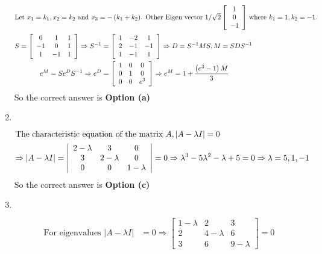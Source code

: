 \begin{enumerate}
\begin{answer}
\begin{align*}
		\intertext{Let $x_{1}=k_{1}, x_{2}=k_{2}$ and $x_{3}=-\left(k_{1}+k_{2}\right)$. Other Eigen vector $1 / \sqrt{2}\left[\begin{array}{c}1 \\ 0 \\ -1\end{array}\right]$ where $k_{1}=1, k_{2}=-1$.}
		S=\left[\begin{array}{ccc}0 & 1 & 1 \\ -1 & 0 & 1 \\ 1 & -1 & 1\end{array}\right] \Rightarrow S^{-1}&=\left[\begin{array}{ccc}1 & -2 & 1 \\ 2 & -1 & -1 \\ 1 & -1 & 1\end{array}\right] \Rightarrow D=S^{-1} M S, M=S D S^{-1}\\
		e^{M}=S e^{D} S^{-1} \Rightarrow e^{D}&=\left[\begin{array}{ccc}1 & 0 & 0 \\ 0 & 1 & 0 \\ 0 & 0 & e^{3}\end{array}\right] \Rightarrow e^{M}=1+\frac{\left(e^{3}-1\right) M}{3}
		\end{align*}
			So the correct answer is \textbf{Option (a)}
	\end{answer}
	\item $\left. \right. $	
	\begin{answer}
		\begin{align*}
		 \intertext{The characteristic equation of the matrix $A,|A-\lambda I|=0$}
		\Rightarrow|A-\lambda I|&=\left|\begin{array}{ccc}
		2-\lambda & 3 & 0 \\
		3 & 2-\lambda & 0 \\
		0 & 0 & 1-\lambda
		\end{array}\right|=0 \Rightarrow \lambda^{3}-5 \lambda^{2}-\lambda+5=0 \Rightarrow \lambda=5,1,-1
		\end{align*}
		So the correct answer is \textbf{Option (c)}
	\end{answer}
		\item $\left. \right. $	
	\begin{answer}
		\begin{align*}
		\text{For eigenvalues }|A-\lambda I|&=0 \Rightarrow\left[\begin{array}{ccc}1-\lambda & 2 & 3 \\ 2 & 4-\lambda & 6 \\ 3 & 6 & 9-\lambda\end{array}\right]=0\\

\end{align*}
\end{answer}
\end{enumerate}
